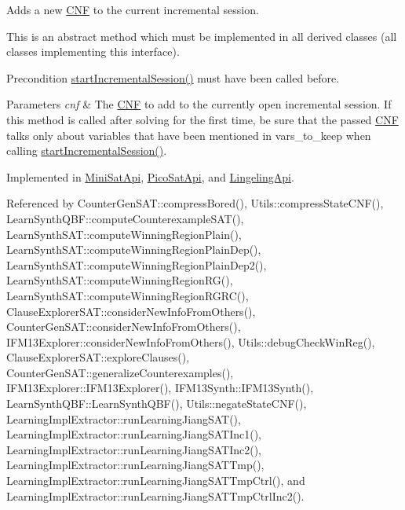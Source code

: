 Adds a new \hyperlink{classCNF}{C\-N\-F} to the current incremental session. 

This is an abstract method which must be implemented in all derived classes (all classes implementing this interface).

\begin{DoxyPrecond}{Precondition}
\hyperlink{classSatSolver_a74603f84c3f2383a5fc44d5a8093cbea}{start\-Incremental\-Session()} must have been called before. 
\end{DoxyPrecond}

\begin{DoxyParams}{Parameters}
{\em cnf} & The \hyperlink{classCNF}{C\-N\-F} to add to the currently open incremental session. If this method is called after solving for the first time, be sure that the passed \hyperlink{classCNF}{C\-N\-F} talks only about variables that have been mentioned in vars\-\_\-to\-\_\-keep when calling \hyperlink{classSatSolver_a74603f84c3f2383a5fc44d5a8093cbea}{start\-Incremental\-Session()}. \\
\hline
\end{DoxyParams}


Implemented in \hyperlink{classMiniSatApi_ae5ffe2811e01051c5206c9e4865a7102}{Mini\-Sat\-Api}, \hyperlink{classPicoSatApi_a619b3cb3b059b06c34f84d9ae123c042}{Pico\-Sat\-Api}, and \hyperlink{classLingelingApi_ae9e54e64007c98add90e142a5c38d4bc}{Lingeling\-Api}.



Referenced by Counter\-Gen\-S\-A\-T\-::compress\-Bored(), Utils\-::compress\-State\-C\-N\-F(), Learn\-Synth\-Q\-B\-F\-::compute\-Counterexample\-S\-A\-T(), Learn\-Synth\-S\-A\-T\-::compute\-Winning\-Region\-Plain(), Learn\-Synth\-S\-A\-T\-::compute\-Winning\-Region\-Plain\-Dep(), Learn\-Synth\-S\-A\-T\-::compute\-Winning\-Region\-Plain\-Dep2(), Learn\-Synth\-S\-A\-T\-::compute\-Winning\-Region\-R\-G(), Learn\-Synth\-S\-A\-T\-::compute\-Winning\-Region\-R\-G\-R\-C(), Clause\-Explorer\-S\-A\-T\-::consider\-New\-Info\-From\-Others(), Counter\-Gen\-S\-A\-T\-::consider\-New\-Info\-From\-Others(), I\-F\-M13\-Explorer\-::consider\-New\-Info\-From\-Others(), Utils\-::debug\-Check\-Win\-Reg(), Clause\-Explorer\-S\-A\-T\-::explore\-Clauses(), Counter\-Gen\-S\-A\-T\-::generalize\-Counterexamples(), I\-F\-M13\-Explorer\-::\-I\-F\-M13\-Explorer(), I\-F\-M13\-Synth\-::\-I\-F\-M13\-Synth(), Learn\-Synth\-Q\-B\-F\-::\-Learn\-Synth\-Q\-B\-F(), Utils\-::negate\-State\-C\-N\-F(), Learning\-Impl\-Extractor\-::run\-Learning\-Jiang\-S\-A\-T(), Learning\-Impl\-Extractor\-::run\-Learning\-Jiang\-S\-A\-T\-Inc1(), Learning\-Impl\-Extractor\-::run\-Learning\-Jiang\-S\-A\-T\-Inc2(), Learning\-Impl\-Extractor\-::run\-Learning\-Jiang\-S\-A\-T\-Tmp(), Learning\-Impl\-Extractor\-::run\-Learning\-Jiang\-S\-A\-T\-Tmp\-Ctrl(), and Learning\-Impl\-Extractor\-::run\-Learning\-Jiang\-S\-A\-T\-Tmp\-Ctrl\-Inc2().

